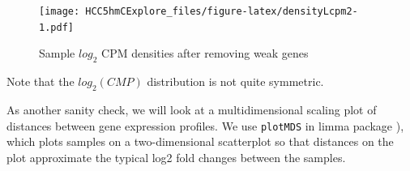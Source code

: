 \documentclass[
]{book}
\newenvironment{Shaded}{\begin{snugshade}}{\end{snugshade}}
\newcommand{\CommentTok}[1]{\textcolor[rgb]{0.56,0.35,0.01}{\textit{#1}}}
\newcommand{\ControlFlowTok}[1]{\textcolor[rgb]{0.13,0.29,0.53}{\textbf{#1}}}
\newcommand{\DataTypeTok}[1]{\textcolor[rgb]{0.13,0.29,0.53}{#1}}
\newcommand{\DecValTok}[1]{\textcolor[rgb]{0.00,0.00,0.81}{#1}}
\newcommand{\FloatTok}[1]{\textcolor[rgb]{0.00,0.00,0.81}{#1}}
\newcommand{\KeywordTok}[1]{\textcolor[rgb]{0.13,0.29,0.53}{\textbf{#1}}}
\newcommand{\NormalTok}[1]{#1}
\newcommand{\OperatorTok}[1]{\textcolor[rgb]{0.81,0.36,0.00}{\textbf{#1}}}
\newcommand{\StringTok}[1]{\textcolor[rgb]{0.31,0.60,0.02}{#1}}
\begin{document}
\begin{Shaded}
\end{Shaded}

\begin{figure}
\centering
\texttt{[image: HCC5hmCExplore\_files/figure-latex/densityLcpm2-1.pdf]}
\caption{\label{fig:densityLcpm2}Sample \(log_2\) CPM densities after removing weak genes}
\end{figure}

Note that the \(log_2(CMP)\) distribution is not quite symmetric.

As another sanity check, we will look at a
multidimensional scaling plot of distances between gene expression
profiles. We use \texttt{plotMDS} in limma package \citep{Ritchie:2015aa}),
which plots samples on a two-dimensional scatterplot so that distances on
the plot approximate the typical log2 fold changes between the
samples.
\end{document}

